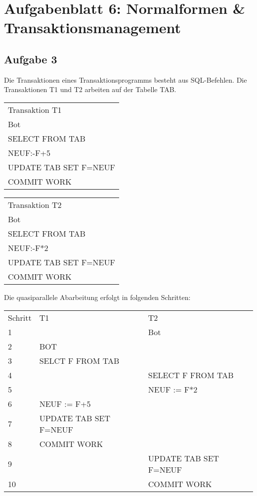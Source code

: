 \documentclass{lehramt-informatik}
\begin{document}
\chapter{Aufgabenblatt 6: Normalformen \& Transaktionsmanagement}

%

\section{Aufgabe 3}

Die Transaktionen eines Transaktionsprogramms besteht aus SQL-Befehlen.
Die Transaktionen T1 und T2 arbeiten auf der Tabelle TAB.

\begin{tabular}{l}
Transaktion T1        \\
Bot                   \\
SELECT FROM TAB       \\
NEUF:-F+5             \\
UPDATE TAB SET F=NEUF \\
COMMIT WORK
\end{tabular}

\begin{tabular}{l}
Transaktion T2        \\
Bot                   \\
SELECT FROM TAB       \\
NEUF:-F*2             \\
UPDATE TAB SET F=NEUF \\
COMMIT WORK
\end{tabular}

Die quasiparallele Abarbeitung erfolgt in folgenden Schritten:

\begin{tabular}{lll}
Schritt & T1                    & T2                    \\
1       &                       & Bot                   \\
2       & BOT                   &                       \\
3       & SELCT F FROM TAB      &                       \\
4       &                       & SELECT F FROM TAB     \\
5       &                       & NEUF := F*2           \\
6       & NEUF := F+5           &                       \\
7       & UPDATE TAB SET F=NEUF &                       \\
8       & COMMIT WORK           &                       \\
9       &                       & UPDATE TAB SET F=NEUF \\
10      &                       & COMMIT WORK
\end{tabular}
\end{document}
